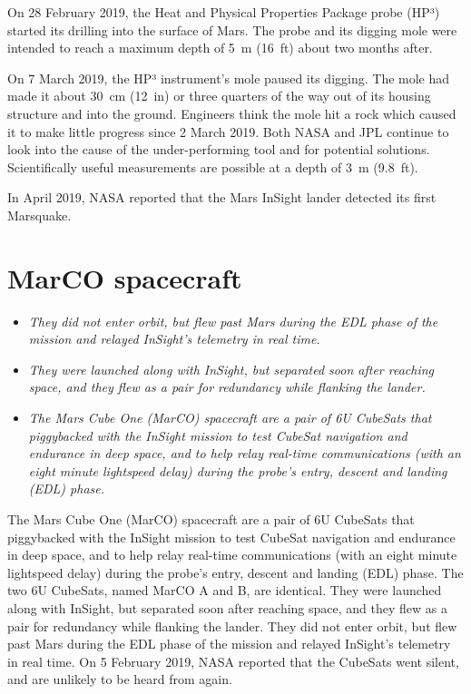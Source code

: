 On 28 February 2019, the Heat and Physical Properties Package probe
(HP³) started its drilling into the surface of Mars. The probe and its
digging mole were intended to reach a maximum depth of 5~m (16~ft) about
two months after.

On 7 March 2019, the HP³ instrument's mole paused its digging. The mole
had made it about 30~cm (12~in) or three quarters of the way out of its
housing structure and into the ground. Engineers think the mole hit a
rock which caused it to make little progress since 2 March 2019. Both
NASA and JPL continue to look into the cause of the under-performing
tool and for potential solutions. Scientifically useful measurements are
possible at a depth of 3~m (9.8~ft).

In April 2019, NASA reported that the Mars InSight lander detected its
first Marsquake.

\section{MarCO spacecraft}\label{marco-spacecraft}

\begin{itemize}
\item
  \emph{They did not enter orbit, but flew past Mars during the EDL
  phase of the mission and relayed InSight's telemetry in real time.}
\item
  \emph{They were launched along with InSight, but separated soon after
  reaching space, and they flew as a pair for redundancy while flanking
  the lander.}
\item
  \emph{The Mars Cube One (MarCO) spacecraft are a pair of 6U CubeSats
  that piggybacked with the InSight mission to test CubeSat navigation
  and endurance in deep space, and to help relay real-time
  communications (with an eight minute lightspeed delay) during the
  probe's entry, descent and landing (EDL) phase.}
\end{itemize}

The Mars Cube One (MarCO) spacecraft are a pair of 6U CubeSats that
piggybacked with the InSight mission to test CubeSat navigation and
endurance in deep space, and to help relay real-time communications
(with an eight minute lightspeed delay) during the probe's entry,
descent and landing (EDL) phase. The two 6U CubeSats, named MarCO A and
B, are identical. They were launched along with InSight, but separated
soon after reaching space, and they flew as a pair for redundancy while
flanking the lander. They did not enter orbit, but flew past Mars during
the EDL phase of the mission and relayed InSight's telemetry in real
time. On 5 February 2019, NASA reported that the CubeSats went silent,
and are unlikely to be heard from again.

